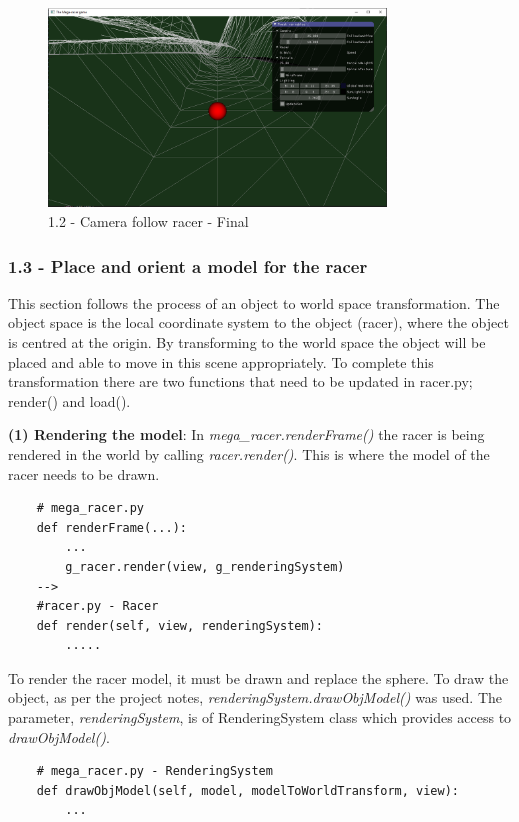 \documentclass[a4 paper, 12pt]{article}
\begin{document}
    \begin{figure} [H]
        \centering
        \includegraphics[width=0.8\textwidth, frame]
            {./images/mega_racer/1.2_b.PNG}
        \caption{1.2 - Camera follow racer - Final}
    \end{figure}  


\subsubsection{1.3 - Place and orient a model for the racer}
This section follows the process of an object to world space transformation. The object space is the local coordinate system to the object (racer), where the object is centred at the origin. By transforming to the world space the object will be placed and able to move in this scene appropriately. To complete this transformation there are two functions that need to be updated in racer.py; render() and load(). 

\textbf{(1) Rendering the model}: In \textit{mega\_racer.renderFrame()} the racer is being rendered in the world by calling \textit{racer.render()}. This is where the model of the racer needs to be drawn. 
    \begin{lstlisting}    
    # mega_racer.py
    def renderFrame(...):
        ...
        g_racer.render(view, g_renderingSystem)  
    -->
    #racer.py - Racer
    def render(self, view, renderingSystem):
        .....
    \end{lstlisting}  

To render the racer model, it must be drawn and replace the sphere. To draw the object, as per the project notes, \textit{renderingSystem.drawObjModel()} was used. The parameter, \textit{renderingSystem}, is of RenderingSystem class which provides access to \textit{drawObjModel()}. 
    \begin{lstlisting}
    # mega_racer.py - RenderingSystem
    def drawObjModel(self, model, modelToWorldTransform, view):
        ...
    \end{lstlisting} 
\end{document}
